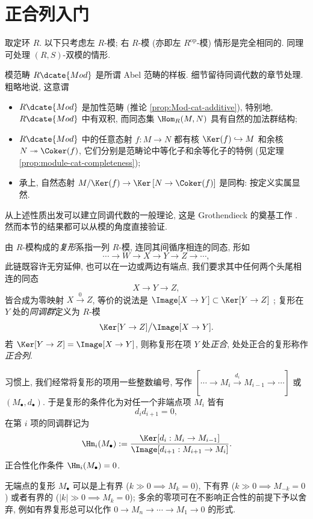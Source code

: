 \section{正合列入门}\label{sec:exactseq-module}
取定环 $R$. 以下只考虑左 $R$-模; 右 $R$-模 (亦即左 $R^\text{op}$-模) 情形是完全相同的. 同理可处理 $(R,S)$-双模的情形.

模范畴 $R\dcate{Mod}$ 是所谓 Abel 范畴的样板. 细节留待同调代数的章节处理. 粗略地说, 这意谓
\begin{itemize}
	\item $R\dcate{Mod}$ 是加性范畴 (推论 \ref{prop:Mod-cat-additive}), 特别地, $R\dcate{Mod}$ 中有双积, 而同态集 $\Hom_R(M, N)$ 具有自然的加法群结构;
	\item $R\dcate{Mod}$ 中的任意态射 $f: M \to N$ 都有核 $\Ker(f) \hookrightarrow M$ 和余核 $N \twoheadrightarrow \Coker(f)$, 它们分别是范畴论中等化子和余等化子的特例 (见定理 \ref{prop:module-cat-completeness});
	\item 承上, 自然态射 $M/\Ker(f) \to \Ker\left[ N \to \Coker(f) \right]$ 是同构: 按定义实属显然.
\end{itemize}
从上述性质出发可以建立同调代数的一般理论, 这是 Grothendieck 的奠基工作 \cite{Gr57}. 然而本节的结果都可以从模的角度直接验证.

\begin{definition}
	由 $R$-模构成的\emph{复形}系指一列 $R$-模, 连同其间循序相连的同态, 形如
	\[ \cdots \to W \to X \to Y \to Z \to \cdots, \]
	此链既容许无穷延伸, 也可以在一边或两边有端点, 我们要求其中任何两个头尾相连的同态
	\[ X \to Y \to Z, \]
	皆合成为零映射 $X \xrightarrow{0} Z$, 等价的说法是 $\Image[X \to Y] \subset \Ker[Y \to Z]$ ; 复形在 $Y$ 处的\emph{同调群}定义为 $R$-模 
	\[ \Ker[Y \to Z] \big/ \Image[X \to Y]. \]
	若 $\Ker[Y \to Z] = \Image[X \to Y]$, 则称复形在项 $Y$ 处\emph{正合}, 处处正合的复形称作\emph{正合列}.
\end{definition}

习惯上, 我们经常将复形的项用一些整数编号, 写作 $[ \cdots \to  M_i \xrightarrow{d_i} M_{i-1} \to \cdots]$ 或 $(M_\bullet, d_\bullet)$. 于是复形的条件化为对任一个非端点项 $M_i$ 皆有
\[ d_i d_{i+1} = 0, \]
在第 $i$ 项的同调群记为
\[ \Hm_i(M_\bullet) := \frac{\Ker[d_i: M_i \to M_{i-1}]}{\Image[d_{i+1}: M_{i+1} \to M_i ]}. \]
正合性化作条件 $\Hm_i(M_\bullet) = 0$.

无端点的复形 $M_\bullet$ 可以是上有界 ($k \gg 0 \implies M_k = 0$), 下有界 ($k \gg 0 \implies M_{-k}=0$) 或者有界的 ($|k| \gg 0 \implies M_k = 0$); 多余的零项可在不影响正合性的前提下予以舍弃, 例如有界复形总可以化作 $0 \to M_n \to \cdots \to M_1 \to 0$ 的形式.

